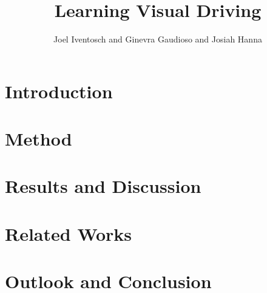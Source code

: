 \documentclass[12pt]{article}
\title{Learning Visual Driving}
\author{Joel Iventosch and Ginevra Gaudioso and Josiah Hanna}
\date{}
\begin{document}
\maketitle

\section{Introduction}


\section{Method}


\section{Results and Discussion}


\section{Related Works}


\section{Outlook and Conclusion}
\end{document}
